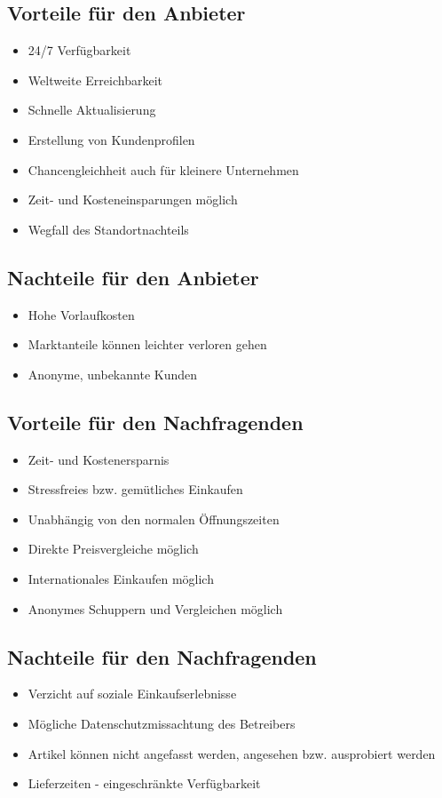 \documentclass[a4paper]{article}
\begin{document}
\subsection{Vorteile für den Anbieter}

\begin{itemize}
\item 24/7 Verfügbarkeit
\item Weltweite Erreichbarkeit
\item Schnelle Aktualisierung
\item Erstellung von Kundenprofilen
\item Chancengleichheit auch für kleinere Unternehmen
\item Zeit- und Kosteneinsparungen möglich
\item Wegfall des Standortnachteils
\end{itemize}

\subsection{Nachteile für den Anbieter}
\begin{itemize}
\item Hohe Vorlaufkosten
\item Marktanteile können leichter verloren gehen
\item Anonyme, unbekannte Kunden
\end{itemize}


\subsection{Vorteile für den Nachfragenden}
\begin{itemize}
\item Zeit- und Kostenersparnis
\item Stressfreies bzw. gemütliches Einkaufen
\item Unabhängig von den normalen Öffnungszeiten
\item Direkte Preisvergleiche möglich
\item Internationales Einkaufen möglich
\item Anonymes Schuppern und Vergleichen möglich
\end{itemize}

\subsection{Nachteile für den Nachfragenden}
\begin{itemize}
\item Verzicht auf soziale Einkaufserlebnisse
\item Mögliche Datenschutzmissachtung des Betreibers
\item Artikel können nicht angefasst werden, angesehen bzw. ausprobiert werden
\item Lieferzeiten - eingeschränkte Verfügbarkeit
\end{itemize}
\end{document}
